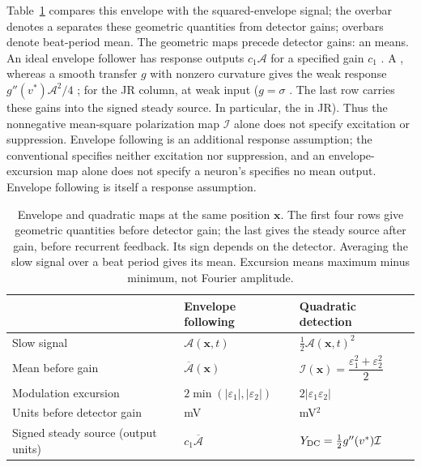 \documentclass[11pt,a4paper]{article}
\newcommand{\Sig}{\sigma}
\providecommand{\DIFaddtex}[1]{{\protect\color{blue} \sf #1}} %
\providecommand{\DIFdeltex}[1]{{\protect\color{red} \scriptsize #1}} %
\providecommand{\DIFaddbegin}{} %
\providecommand{\DIFaddend}{} %
\providecommand{\DIFdelbegin}{} %
\providecommand{\DIFdelend}{} %
\providecommand{\DIFadd}[1]{\texorpdfstring{\DIFaddtex{#1}}{#1}} %
\providecommand{\DIFdel}[1]{\texorpdfstring{\DIFdeltex{#1}}{}} %
\begin{document}
\DIFaddend Table~\ref{tab:transduction-maps} \DIFdelbegin \DIFdel{compares this envelope with the squared-envelope
signal; the overbar denotes a }\DIFdelend \DIFaddbegin \DIFadd{separates these geometric quantities from
detector gains; overbars denote }\DIFaddend beat-period \DIFdelbegin \DIFdel{mean. The geometric maps precede detector gains: an }\DIFdelend \DIFaddbegin \DIFadd{means. An }\DIFaddend ideal envelope follower
\DIFdelbegin \DIFdel{has
response }\DIFdelend \DIFaddbegin \DIFadd{outputs }\DIFaddend $c_1\mathcal A$ for \DIFdelbegin \DIFdel{a specified }\DIFdelend gain $c_1$\DIFdelbegin \DIFdel{. A }\DIFdelend \DIFaddbegin \DIFadd{, whereas a }\DIFaddend smooth transfer $g$ with
nonzero curvature gives \DIFdelbegin \DIFdel{the weak response }\DIFdelend $g''(v^*)\mathcal A^2/4$ \DIFdelbegin \DIFdel{;
for the JR column, }\DIFdelend \DIFaddbegin \DIFadd{at weak input (}\DIFaddend $g=\Sig$ \DIFdelbegin \DIFdel{.
The last row carries these gains into the signed steady source. In particular,
the }\DIFdelend \DIFaddbegin \DIFadd{in JR).
Thus the }\DIFaddend nonnegative mean-square \DIFdelbegin \DIFdel{polarization }\DIFdelend \DIFaddbegin \DIFadd{map }\DIFaddend $\mathcal I$ \DIFdelbegin \DIFdel{alone does not specify
excitation
or suppression.
Envelope following is an additional response assumption; the conventional
}\DIFdelend \DIFaddbegin \DIFadd{specifies neither excitation
nor suppression, and an }\DIFaddend envelope-excursion map alone \DIFdelbegin \DIFdel{does not specify a neuron's }\DIFdelend \DIFaddbegin \DIFadd{specifies no }\DIFaddend mean output.
\DIFaddbegin \DIFadd{Envelope following is itself a response assumption.
}\DIFaddend

\begin{table}[ht]
\centering\small
\renewcommand{\arraystretch}{1.4}
\begin{tabular}{@{}>{\raggedright\arraybackslash}p{}
 >{\raggedright\arraybackslash}p{}
 >{\raggedright\arraybackslash}p{}@{}}
\toprule
 & Envelope following & Quadratic detection \\
\midrule
Slow signal & $\mathcal A(\mathbf x,t)$ & $\tfrac12\mathcal A(\mathbf x,t)^2$ \\
Mean before gain & $\overline{\mathcal A}(\mathbf x)$
 & $\mathcal I(\mathbf x)=\dfrac{\varepsilon_1^2+\varepsilon_2^2}{2}$ \\
Modulation excursion & $2\min(|\varepsilon_1|,|\varepsilon_2|)$
 & $2|\varepsilon_1\varepsilon_2|$ \\
Units before detector gain & mV & mV$^2$ \\
Signed steady source (output units) & $c_1\overline{\mathcal A}$
 & $Y_{\rm DC}=\tfrac12g''(v^*)\mathcal I$ \\
\bottomrule
\end{tabular}
\caption{Envelope and quadratic maps at the same position $\mathbf x$.
The first four rows give geometric quantities before detector gain; the last
gives the steady source after gain, before recurrent feedback. Its sign depends
on the detector. Averaging the slow signal over a beat period gives its mean.
Excursion means maximum minus minimum, not Fourier amplitude.}
\label{tab:transduction-maps}
\end{table}
\end{document}
